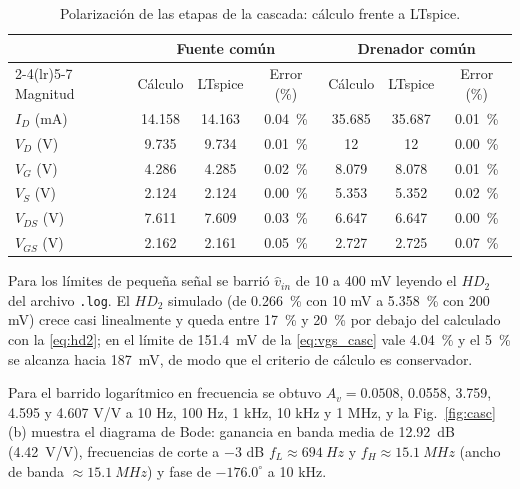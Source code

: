 \documentclass[conference]{IEEEtran}
\begin{document}
\begin{table}[htbp]
\centering
\caption{Polarización de las etapas de la cascada: cálculo frente a LTspice.}
\label{tab:casc}
\scriptsize
\renewcommand{\arraystretch}{1.03}
\setlength{\tabcolsep}{2.5pt}
\begin{tabular}{@{}lcccccc@{}}
\toprule
 & \multicolumn{3}{c}{Fuente común} & \multicolumn{3}{c}{Drenador común} \\
\cmidrule(lr){2-4}\cmidrule(lr){5-7}
Magnitud & Cálculo & LTspice & Error (\%) & Cálculo & LTspice & Error (\%) \\
\midrule
$I_D$ (mA) & 14.158 & 14.163 & \SI{0.04}{\percent} & 35.685 & 35.687 & \SI{0.01}{\percent} \\
$V_D$ (V) & 9.735 & 9.734 & \SI{0.01}{\percent} & 12 & 12 & \SI{0.00}{\percent} \\
$V_G$ (V) & 4.286 & 4.285 & \SI{0.02}{\percent} & 8.079 & 8.078 & \SI{0.01}{\percent} \\
$V_S$ (V) & 2.124 & 2.124 & \SI{0.00}{\percent} & 5.353 & 5.352 & \SI{0.02}{\percent} \\
$V_{DS}$ (V) & 7.611 & 7.609 & \SI{0.03}{\percent} & 6.647 & 6.647 & \SI{0.00}{\percent} \\
$V_{GS}$ (V) & 2.162 & 2.161 & \SI{0.05}{\percent} & 2.727 & 2.725 & \SI{0.07}{\percent} \\
\bottomrule
\end{tabular}
\end{table}

Para los límites de pequeña señal se barrió $\hat v_{in}$ de 10 a 400 mV leyendo el $HD_2$ del archivo \texttt{.log}. El $HD_2$ simulado (de \SI{0.266}{\percent} con 10 mV a \SI{5.358}{\percent} con 200 mV) crece casi linealmente y queda entre \SI{17}{\percent} y \SI{20}{\percent} por debajo del calculado con la \eqref{eq:hd2}; en el límite de \SI{151.4}{mV} de la \eqref{eq:vgs_casc} vale \SI{4.04}{\percent} y el \SI{5}{\percent} se alcanza hacia \SI{187}{mV}, de modo que el criterio de cálculo es conservador.

Para el barrido logarítmico en frecuencia se obtuvo $A_v=0.0508$, 0.0558, 3.759, 4.595 y 4.607 V/V a 10 Hz, 100 Hz, 1 kHz, 10 kHz y 1 MHz, y la Fig.~\ref{fig:casc}(b) muestra el diagrama de Bode: ganancia en banda media de \SI{12.92}{dB} (\SI{4.42}{V/V}), frecuencias de corte a $-3$ dB $f_L\approx\SI{694}{Hz}$ y $f_H\approx\SI{15.1}{MHz}$ (ancho de banda $\approx\SI{15.1}{MHz}$) y fase de $-176.0^\circ$ a 10 kHz.
\end{document}
